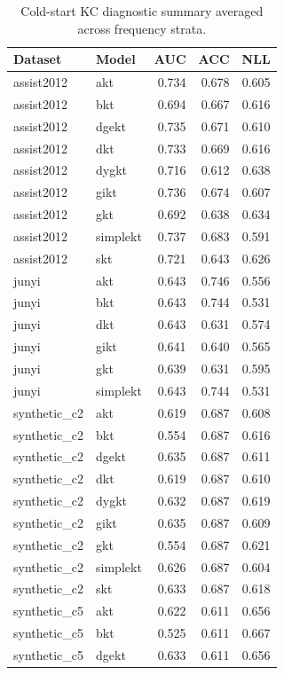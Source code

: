 \begin{table}[t]
\centering
\caption{Cold-start KC diagnostic summary averaged across frequency strata.}
\label{tab:cold-start}
\begin{tabular}{llrrr}
\toprule
Dataset & Model & AUC & ACC & NLL \\
\midrule
assist2012 & akt & 0.734 & 0.678 & 0.605 \\
assist2012 & bkt & 0.694 & 0.667 & 0.616 \\
assist2012 & dgekt & 0.735 & 0.671 & 0.610 \\
assist2012 & dkt & 0.733 & 0.669 & 0.616 \\
assist2012 & dygkt & 0.716 & 0.612 & 0.638 \\
assist2012 & gikt & 0.736 & 0.674 & 0.607 \\
assist2012 & gkt & 0.692 & 0.638 & 0.634 \\
assist2012 & simplekt & 0.737 & 0.683 & 0.591 \\
assist2012 & skt & 0.721 & 0.643 & 0.626 \\
junyi & akt & 0.643 & 0.746 & 0.556 \\
junyi & bkt & 0.643 & 0.744 & 0.531 \\
junyi & dkt & 0.643 & 0.631 & 0.574 \\
junyi & gikt & 0.641 & 0.640 & 0.565 \\
junyi & gkt & 0.639 & 0.631 & 0.595 \\
junyi & simplekt & 0.643 & 0.744 & 0.531 \\
synthetic_c2 & akt & 0.619 & 0.687 & 0.608 \\
synthetic_c2 & bkt & 0.554 & 0.687 & 0.616 \\
synthetic_c2 & dgekt & 0.635 & 0.687 & 0.611 \\
synthetic_c2 & dkt & 0.619 & 0.687 & 0.610 \\
synthetic_c2 & dygkt & 0.632 & 0.687 & 0.619 \\
synthetic_c2 & gikt & 0.635 & 0.687 & 0.609 \\
synthetic_c2 & gkt & 0.554 & 0.687 & 0.621 \\
synthetic_c2 & simplekt & 0.626 & 0.687 & 0.604 \\
synthetic_c2 & skt & 0.633 & 0.687 & 0.618 \\
synthetic_c5 & akt & 0.622 & 0.611 & 0.656 \\
synthetic_c5 & bkt & 0.525 & 0.611 & 0.667 \\
synthetic_c5 & dgekt & 0.633 & 0.611 & 0.656 \\

\end{tabular}
\end{table}
